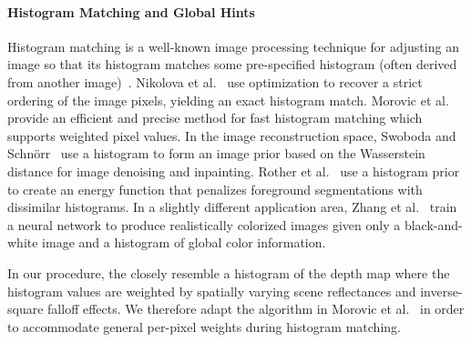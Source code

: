 \paragraph{Histogram Matching and Global Hints}
%
Histogram matching is a well-known image processing technique for adjusting an
image so that its histogram matches some pre-specified histogram (often derived
from another image)~\cite{gonzales1977gray,Gonzalez2008}. Nikolova et
al.~\cite{Nikolova2013} use optimization to recover a strict ordering of the
image pixels, yielding an exact histogram match. Morovic et
al.~\cite{Morovic2002} provide an efficient and precise method for fast
histogram matching which supports weighted pixel values. In the image
reconstruction space, Swoboda and Schn\"orr~\cite{Swoboda2013} use a histogram
to form an image prior based on the Wasserstein distance for image denoising and
inpainting. Rother et al.~\cite{Rother2006} use a histogram prior to create an
energy function that penalizes foreground segmentations with dissimilar
histograms.  In a slightly different application area, Zhang et
al.~\cite{Zhang2017} train a neural network to produce realistically colorized
images given only a black-and-white image and a histogram of global color
information.


In our procedure, the  closely resemble a histogram of
the depth map where the histogram values are weighted by spatially varying scene
reflectances and inverse-square falloff effects. We therefore adapt the
algorithm in Morovic et al.~\cite{Morovic2002} in order to accommodate general
per-pixel weights during histogram matching.


%


